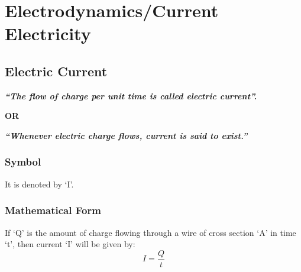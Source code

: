 \chapter{Electrodynamics/Current Electricity}
\label{12}
\section{Electric Current}
\textit{\textbf{“The flow of charge per unit time is called electric current”.}}
\begin{center}
    \textbf{OR}
\end{center}
\textit{\textbf{“Whenever electric charge flows, current is said to exist.”}}
\subsection*{Symbol}
It is denoted by `I'.
\subsection*{Mathematical Form}
If `Q' is the amount of charge flowing through a wire of cross section ‘A’ in time ‘t’, then current ‘I’ will be given by:
\begin{equation}\label{eq:12.1}
    I = \frac{Q}{t}
\end{equation}   
